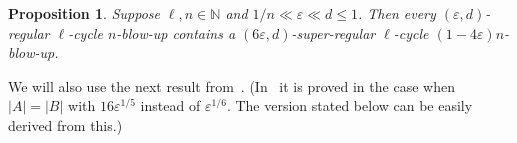 \documentclass[a4paper, 11pt, reqno]{amsart}
\newtheorem{proposition}[definition]{Proposition}
\numberwithin{equation}{section}
\newcommand{\1}{{\rm 1\hspace*{-0.4ex}%
\rule{0.1ex}{1.52ex}\hspace*{0.2ex}}}
\newcommand{\N}{\mathbb N}
\renewcommand{\epsilon}{\varepsilon}
\newcommand{\COMMENT}[1]{}
\begin{document}
\begin{proposition}\label{prop: making super reg}
Suppose $\ell,n\in \N$ and $1/n \ll\epsilon\ll d\leq 1$.
Then
every $(\epsilon,d)$-regular $\ell$-cycle $n$-blow-up
contains a $(6\epsilon,d)$-super-regular $\ell$-cycle $(1- 4\epsilon)n$-blow-up.
\end{proposition}
\COMMENT{\begin{proof}
Let $G$ be a $(\epsilon,d)$-regular $\ell$-cycle $n$-blow-up
with vertex set $V_1\cup\ldots\cup V_\ell$.
For every $i\in [\ell]$,
let $X_i$ and $Y_i$ be the set of vertices in $V_i$
that do not have $(d\pm\epsilon)n$ neighbours in $V_{i-1}$ and $V_{i+1}$, respectively, where we consider the indices modulo $\ell$.

By Proposition~\ref{prop: reg right deg}, $|X_i|,|Y_i|\leq  2\epsilon n$.
Let $Z_i\subseteq V_i$ be a set of $4\epsilon n$ vertices containing $X_i \cup Y_i$.
Let $G'$ be the graph obtained from $G$ by deleting all vertices in $Z_1\cup \ldots \cup Z_\ell$.
By Proposition~\ref{prop: reg smaller}, $G'$ is a $(6\epsilon,d)$-super-regular $\ell$-cycle $(1- 4\epsilon)n$-blow-up.
\end{proof}}

We will also use the next result from~\cite{DLR95}.
(In~\cite{DLR95} it is proved in the case when $|A|=|B|$ with $16\epsilon^{1/5}$ instead of $\epsilon^{1/6}$.
The version stated below can be easily derived from this.)
\end{document}
